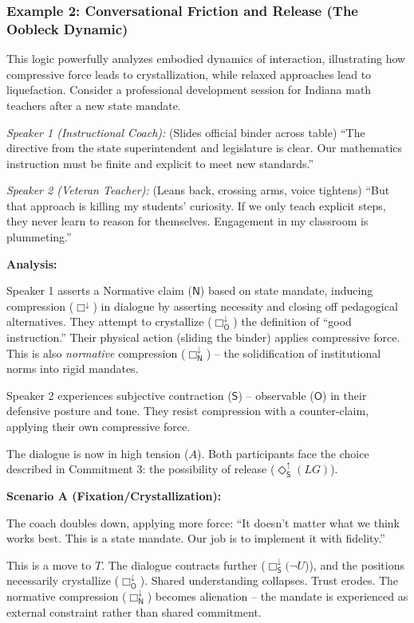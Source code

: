 \documentclass[12pt]{book}
\newcommand{\SBoxDown}{\Box_{\mathsf{S}}^{\downarrow}}
\newcommand{\SDiaUp}{\Diamond_{\mathsf{S}}^{\uparrow}}
\newcommand{\OBoxDown}{\Box_{\mathsf{O}}^{\downarrow}}
\newcommand{\NBoxDown}{\Box_{\mathsf{N}}^{\downarrow}}
\begin{document}
\subsubsection{Example 2: Conversational Friction and Release (The Oobleck Dynamic)}

This logic powerfully analyzes embodied dynamics of interaction, illustrating how compressive force leads to crystallization, while relaxed approaches lead to liquefaction. Consider a professional development session for Indiana math teachers after a new state mandate.

\textit{Speaker 1 (Instructional Coach):} (Slides official binder across table) ``The directive from the state superintendent and legislature is clear. Our mathematics instruction must be finite and explicit to meet new standards.''

\textit{Speaker 2 (Veteran Teacher):} (Leans back, crossing arms, voice tightens) ``But that approach is killing my students' curiosity. If we only teach explicit steps, they never learn to reason for themselves. Engagement in my classroom is plummeting.''

\textbf{Analysis:}

Speaker 1 asserts a Normative claim ($\mathsf{N}$) based on state mandate, inducing compression ($\Box^{\downarrow}$) in dialogue by asserting necessity and closing off pedagogical alternatives. They attempt to crystallize ($\OBoxDown$) the definition of ``good instruction.'' Their physical action (sliding the binder) applies compressive force. This is also \textit{normative} compression ($\NBoxDown$) -- the solidification of institutional norms into rigid mandates.

Speaker 2 experiences subjective contraction ($\mathsf{S}$) -- observable ($\mathsf{O}$) in their defensive posture and tone. They resist compression with a counter-claim, applying their own compressive force.

The dialogue is now in high tension ($A$). Both participants face the choice described in Commitment 3: the possibility of release ($\SDiaUp(LG)$).

\textbf{Scenario A (Fixation/Crystallization):}

The coach doubles down, applying more force: ``It doesn't matter what we think works best. This is a state mandate. Our job is to implement it with fidelity.''

This is a move to $T$. The dialogue contracts further ($\SBoxDown(\neg U$)), and the positions necessarily crystallize ($\OBoxDown$). Shared understanding collapses. Trust erodes. The normative compression ($\NBoxDown$) becomes alienation -- the mandate is experienced as external constraint rather than shared commitment.
\end{document}
